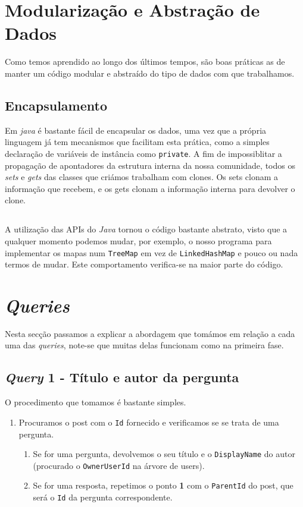 \documentclass[10pt]{article}
\begin{document}
	
	
\pagebreak

\section{Modularização e Abstração de Dados}
		Como temos aprendido ao longo dos últimos tempos, são boas práticas as de 
	manter um código modular e abstraído do tipo de dados com que	trabalhamos.
	
	\subsection*{Encapsulamento}
	
		Em \textit{java} é bastante fácil de encapsular os dados, 
	uma vez que a própria linguagem já tem mecanismos que facilitam 
	esta prática, como a simples declaração de variáveis de instância 
	como \texttt{private}. A fim de impossiblitar a propagação de 
	apontadores da estrutura interna da nossa comunidade, todos os
	\textit{sets} e \textit{gets} das classes que criámos trabalham 
	com clones. Os sets clonam a informação que recebem, e os gets 
	clonam a informação interna para devolver o clone.
	
	
	
	
	\subsection*{}
		A utilização das APIs do \textit{Java} tornou o código 
	bastante abstrato, visto que a qualquer momento podemos mudar, 
	por exemplo, o nosso programa para implementar os mapas num 
	\texttt{TreeMap} em vez de \texttt{LinkedHashMap} e pouco ou 
	nada termos de mudar. Este comportamento verifica-se na maior 
	parte do código.

\section{\textit{Queries}}
		Nesta secção passamos a explicar a abordagem que tomámos 
	em relação a cada uma das \textit{queries}, note-se que muitas 
	delas funcionam como na primeira fase.
	\subsection*{\textit{Query} 1 - Título e autor da pergunta}
		O procedimento que tomamos é bastante simples. 
		\begin{enumerate}
		\item Procuramos o post com o \texttt{Id} fornecido e verificamos se se trata
		 de uma pergunta. 
		\begin{enumerate}
		\item Se for uma pergunta, devolvemos o seu título e o \texttt{DisplayName} do autor 
	(procurado o \texttt{OwnerUserId} na árvore de users).
	
		\item Se for uma resposta, repetimos o ponto \textbf{1} com o \texttt{ParentId}
		do post, que será o \texttt{Id} da pergunta correspondente.
		\end{enumerate}
		\end{enumerate}
\end{document}
